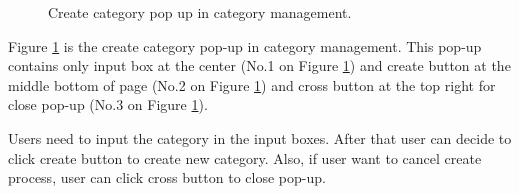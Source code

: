 \documentclass[12pt,oneside,openright,a4paper]{cpe-english-project}
\begin{document}
		\begin{figure}[!h]\centering
			\caption{Create category pop up in category management.}\label{fig:Create_category_pop_up_in_category_management_done}
		\end{figure}
		\begin{flushleft}
			Figure \ref*{fig:Create_category_pop_up_in_category_management_done} is the create category pop-up in category management. This pop-up contains only input box at the center (No.1 on Figure \ref*{fig:Create_category_pop_up_in_category_management_done}) and create button at the middle bottom of page (No.2 on Figure \ref*{fig:Create_category_pop_up_in_category_management_done}) and cross button at the top right for close pop-up (No.3 on Figure \ref*{fig:Create_category_pop_up_in_category_management_done}).
		\end{flushleft}
		\begin{flushleft}
			Users need to input the category in the input boxes. After that user can decide to click create button to create new category. Also, if user want to cancel create process, user can click cross button to close pop-up.
		\end{flushleft}
\end{document}

